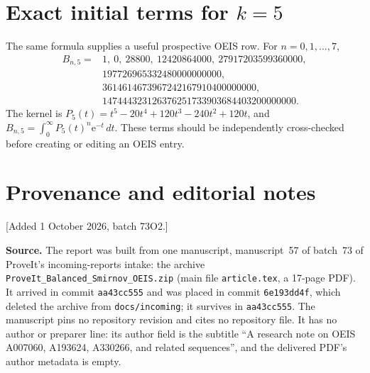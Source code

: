 \documentclass[11pt,letterpaper]{article}
\theoremstyle{definition}
\theoremstyle{remark}
\newcommand{\ee}{\mathrm e}
\begin{document}
\section{Exact initial terms for \texorpdfstring{$k=5$}{k=5}}

The same formula supplies a useful prospective OEIS row.  For $n=0,1,\ldots,7$,
\begin{align*}
 B_{n,5}={}&1,\ 0,\ 28800,\ 12420864000,\ 27917203599360000,\\
 &197726965332480000000000,\\
 &3614614673967242167910400000000,\\
 &147444323126376251733903684403200000000.
\end{align*}
The kernel is
$P_5(t)=t^5-20t^4+120t^3-240t^2+120t$, and
$B_{n,5}=\int_0^\infty P_5(t)^n\ee^{-t}\,dt$.
These terms should be independently cross-checked before creating or editing
an OEIS entry.

\section{Provenance and editorial notes}\label{bsw:app:provenance}

[Added 1 October 2026, batch 73O2.]

\textbf{Source.}  The report was built from one manuscript, manuscript~57 of
batch~73 of ProveIt's incoming-reports intake: the archive
\texttt{ProveIt\_Balanced\_Smirnov\_OEIS.zip} (main file
\texttt{article.tex}, a 17-page PDF).  It arrived in commit
\texttt{aa43cc555} and was placed in commit \texttt{6e193dd4f}, which deleted
the archive from \texttt{docs/incoming}; it survives in \texttt{aa43cc555}.
The manuscript pins no repository revision and cites no repository file.  It
has no author or preparer line: its author field is the subtitle ``A research
note on OEIS A007060, A193624, A330266, and related sequences'', and the
delivered PDF's author metadata is empty.
\end{document}
